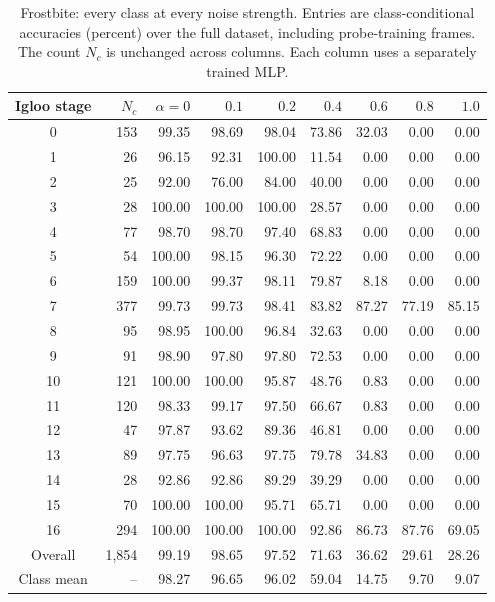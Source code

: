 \documentclass{article} %
\begin{document}
\begin{table}[!t]
\centering
\small
\setlength{\tabcolsep}{4pt}
\caption{Frostbite: every class at every noise strength. Entries are class-conditional accuracies (percent) over the full dataset, including probe-training frames. The count $N_c$ is unchanged across columns. Each column uses a separately trained MLP.}
\label{tab:per_class_noise_frostbite}
\begin{tabular}{crrrrrrrr}
\toprule
Igloo stage & $N_c$ & $\alpha=0$ & $0.1$ & $0.2$ & $0.4$ & $0.6$ & $0.8$ & $1.0$ \\
\midrule
0 & 153 & 99.35 & 98.69 & 98.04 & 73.86 & 32.03 & 0.00 & 0.00 \\
1 & 26 & 96.15 & 92.31 & 100.00 & 11.54 & 0.00 & 0.00 & 0.00 \\
2 & 25 & 92.00 & 76.00 & 84.00 & 40.00 & 0.00 & 0.00 & 0.00 \\
3 & 28 & 100.00 & 100.00 & 100.00 & 28.57 & 0.00 & 0.00 & 0.00 \\
4 & 77 & 98.70 & 98.70 & 97.40 & 68.83 & 0.00 & 0.00 & 0.00 \\
5 & 54 & 100.00 & 98.15 & 96.30 & 72.22 & 0.00 & 0.00 & 0.00 \\
6 & 159 & 100.00 & 99.37 & 98.11 & 79.87 & 8.18 & 0.00 & 0.00 \\
7 & 377 & 99.73 & 99.73 & 98.41 & 83.82 & 87.27 & 77.19 & 85.15 \\
8 & 95 & 98.95 & 100.00 & 96.84 & 32.63 & 0.00 & 0.00 & 0.00 \\
9 & 91 & 98.90 & 97.80 & 97.80 & 72.53 & 0.00 & 0.00 & 0.00 \\
10 & 121 & 100.00 & 100.00 & 95.87 & 48.76 & 0.83 & 0.00 & 0.00 \\
11 & 120 & 98.33 & 99.17 & 97.50 & 66.67 & 0.83 & 0.00 & 0.00 \\
12 & 47 & 97.87 & 93.62 & 89.36 & 46.81 & 0.00 & 0.00 & 0.00 \\
13 & 89 & 97.75 & 96.63 & 97.75 & 79.78 & 34.83 & 0.00 & 0.00 \\
14 & 28 & 92.86 & 92.86 & 89.29 & 39.29 & 0.00 & 0.00 & 0.00 \\
15 & 70 & 100.00 & 100.00 & 95.71 & 65.71 & 0.00 & 0.00 & 0.00 \\
16 & 294 & 100.00 & 100.00 & 100.00 & 92.86 & 86.73 & 87.76 & 69.05 \\
\midrule
Overall & 1,854 & 99.19 & 98.65 & 97.52 & 71.63 & 36.62 & 29.61 & 28.26 \\
Class mean & -- & 98.27 & 96.65 & 96.02 & 59.04 & 14.75 & 9.70 & 9.07 \\
\bottomrule
\end{tabular}
\end{table}
\end{document}
